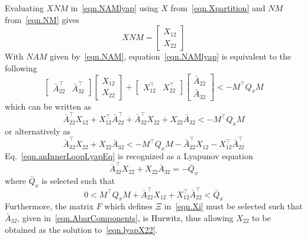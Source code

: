Evaluating $XNM$ in\ \eqref{eqn.NAMlyap} using $X$ from\ \eqref{eqn.Xpartition} and $NM$ from\ \eqref{eqn.NM} gives
\begin{equation*}
  XNM=
  \begin{bmatrix}
    X_{12} \\
    X_{22}
  \end{bmatrix}
\end{equation*}
With $NAM$ given by\ \eqref{eqn.NAM}, equation\ \eqref{eqn.NAMlyap} is equivalent to the following
\begin{equation*}
  \begin{bmatrix}
    \bar{A}_{22}^{\top} & \bar{A}_{32}^{\top}
  \end{bmatrix}
  \begin{bmatrix}
    X_{12} \\
    X_{22}
  \end{bmatrix}
  +
  \begin{bmatrix}
    X_{12}^{\top} & X_{22}^{\top}
  \end{bmatrix}
  \begin{bmatrix}
    \bar{A}_{22} \\
    \bar{A}_{32}
  \end{bmatrix}
  <-M^{\top}Q_{x}M
\end{equation*}
which can be written as
\begin{equation*}
  \bar{A}_{22}^{\top}X_{12}
  + X_{12}^{\top}\bar{A}_{22}^{\top}
  + \bar{A}_{32}^{\top}X_{22}
  + X_{22}\bar{A}_{32}
  < -M^{\top}Q_{x}M
\end{equation*}
or alternatively as
\begin{equation}
  \label{eqn.anInnerLoopLyapEq}
  \bar{A}_{32}^{\top}X_{22}
  + X_{22}\bar{A}_{32}
  <
  - M^{\top}Q_{x}M
  - \bar{A}_{22}^{\top}X_{12}
  - X_{12}^{\top}\bar{A}_{22}^{\top}
\end{equation}
Eq.\ \eqref{eqn.anInnerLoopLyapEq} is recognized as a Lyapunov equation
\begin{equation}
  \label{eqn.lyapX22}
  \bar{A}_{32}^{\top}X_{22}+X_{22}\bar{A}_{32}
  =
  - \bar{Q}_{x}
\end{equation}
where $\bar{Q}_{x}$ is selected such that
\begin{equation}
  \label{eqn.Qbar}
  0
  <
  M^{\top}Q_{x}M + \bar{A}_{22}^{\top}X_{12} + X_{12}^{\top}\bar{A}_{22}^{\top}
  <
  \bar{Q}_{x}
\end{equation}
Furthermore, the matrix $F$ which defines $\Xi$ in\ \eqref{eqn.Xi} must be selected such that $\bar{A}_{32}$, given in\ \eqref{eqn.AbarComponents}, is Hurwitz, thus allowing $X_{22}$ to be obtained as the solution to\ \eqref{eqn.lyapX22}.
